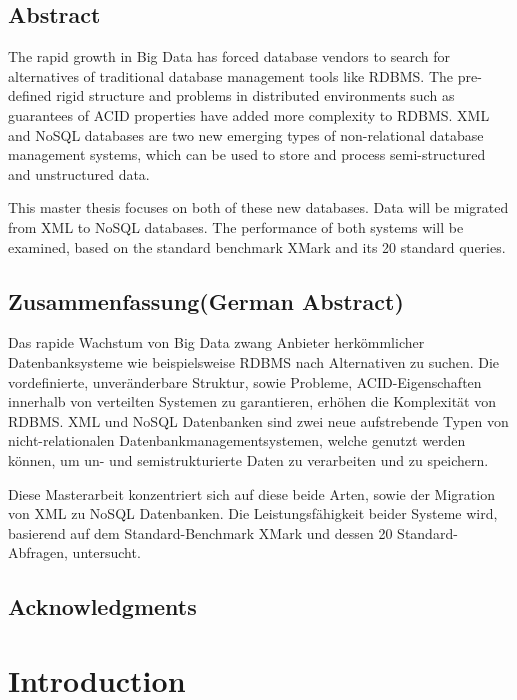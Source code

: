 \documentclass[a4paper,12pt]{book}
\begin{document}
	\section*{Abstract}
	
	The rapid growth in Big Data has forced database vendors to search for alternatives of traditional database management tools like RDBMS. The pre-defined rigid structure and problems in distributed environments such as guarantees of ACID properties have added more complexity to RDBMS. XML and NoSQL databases are two new emerging types of non-relational database management systems, which can be used to store and process semi-structured and unstructured data.
	
This master thesis focuses on both of these new databases. Data will be migrated from XML to NoSQL databases. The performance of both systems will be examined, based on the standard benchmark XMark and its 20 standard queries. 
	
	\section*{Zusammenfassung(German Abstract)}
	Das rapide Wachstum von Big Data zwang Anbieter herk\"{o}mmlicher Datenbanksysteme wie beispielsweise RDBMS nach Alternativen zu suchen. Die vordefinierte, unver\"{a}nderbare Struktur, sowie Probleme, ACID-Eigenschaften innerhalb von verteilten Systemen zu garantieren, erh\"{o}hen die Komplexit\"{a}t von RDBMS. XML und NoSQL Datenbanken sind zwei neue aufstrebende Typen von nicht-relationalen
Datenbankmanagementsystemen, welche genutzt werden k\"{o}nnen, um un- und semistrukturierte Daten zu verarbeiten und zu speichern. 

Diese Masterarbeit konzentriert sich auf diese beide Arten, sowie der Migration von XML zu NoSQL Datenbanken. Die Leistungsf\"{a}higkeit beider Systeme wird, basierend auf dem Standard-Benchmark XMark und dessen 20 Standard-Abfragen, untersucht.
	\newpage
	\section*{Acknowledgments}
	
	\thispagestyle{empty}
	\newpage
	\tableofcontents
	\thispagestyle{empty}
	\newpage
	\chapter{Introduction}
	\setcounter{page}{1}
\end{document}
